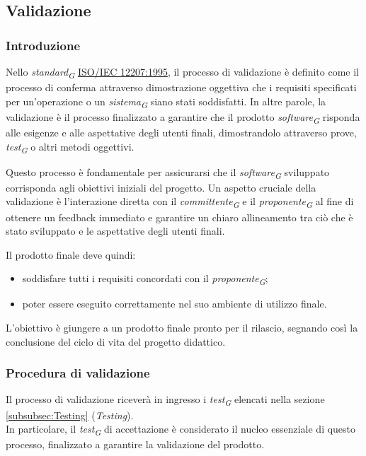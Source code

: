 \subsection{Validazione}
\label{subsec:validazione}

\subsubsection{Introduzione}
Nello \textit{standard}\textsubscript{\textit{G}} \href{https://www.math.unipd.it/~tullio/IS-1/2009/Approfondimenti/ISO_12207-1995.pdf}{ISO/IEC 12207:1995}, il processo di validazione è definito come il processo di conferma attraverso dimostrazione oggettiva che i requisiti specificati per un'operazione o un \textit{sistema}\textsubscript{\textit{G}} siano stati soddisfatti. In altre parole, la validazione è il processo finalizzato a garantire che il prodotto \textit{software}\textsubscript{\textit{G}} risponda alle esigenze e alle aspettative degli utenti finali, dimostrandolo attraverso prove, \textit{test}\textsubscript{\textit{G}} o altri metodi oggettivi.

\vspace{0.2cm}

Questo processo è fondamentale per assicurarsi che il \textit{software}\textsubscript{\textit{G}} sviluppato corrisponda agli obiettivi iniziali del progetto. Un aspetto cruciale della validazione è l'interazione diretta con il \textit{committente}\textsubscript{\textit{G}} e il \textit{proponente}\textsubscript{\textit{G}} al fine di ottenere un feedback immediato e garantire un chiaro allineamento tra ciò che è stato sviluppato e le aspettative degli utenti finali.

\vspace{0.2cm}

Il prodotto finale deve quindi: 
\begin{itemize}
    \item 
        soddisfare tutti i requisiti concordati con il \textit{proponente}\textsubscript{\textit{G}}; 
    \item 
        poter essere eseguito correttamente nel suo ambiente di utilizzo finale.
\end{itemize}

L'obiettivo è giungere a un prodotto finale pronto per il rilascio, segnando così la conclusione del ciclo di vita del progetto didattico. 

\subsubsection{Procedura di validazione}
Il processo di validazione riceverà in ingresso i \textit{test}\textsubscript{\textit{G}} elencati nella sezione \ref{subsubsec:Testing} (\textit{Testing}). \\
In particolare, il \textit{test}\textsubscript{\textit{G}} di accettazione è considerato il nucleo essenziale di questo processo, finalizzato a garantire la validazione del prodotto.

